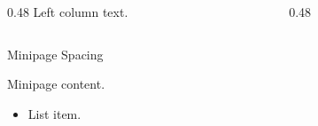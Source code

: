 \documentclass[14pt,t]{beamer-accessibility}
\title{}
\author{}
\date{}
\begin{document}
\begin{frame}
\begin{columns}
\begin{column}{0.48\textwidth}
Left column text.
\end{column}
\begin{column}{0.48\textwidth}
\end{column}
\end{columns}
\end{frame}
\begin{frame}{Minipage Spacing}
\begin{minipage}{\textwidth}
Minipage content.
\end{minipage}
\begin{itemize}
\item List item.
\end{itemize}
\end{frame}
\end{document}
